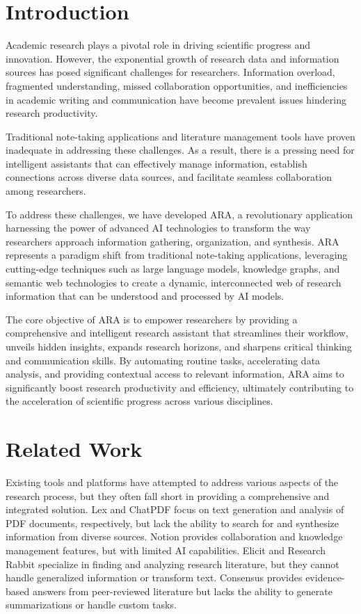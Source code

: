 \documentclass[a4paper,conference]{IEEEtran}
\begin{document}
\section{Introduction}
Academic research plays a pivotal role in driving scientific progress and innovation. However, the exponential growth of research data and information sources has posed significant challenges for researchers. Information overload, fragmented understanding, missed collaboration opportunities, and inefficiencies in academic writing and communication have become prevalent issues hindering research productivity.

Traditional note-taking applications and literature management tools have proven inadequate in addressing these challenges. As a result, there is a pressing need for intelligent assistants that can effectively manage information, establish connections across diverse data sources, and facilitate seamless collaboration among researchers.

To address these challenges, we have developed ARA, a revolutionary application harnessing the power of advanced AI technologies to transform the way researchers approach information gathering, organization, and synthesis. ARA represents a paradigm shift from traditional note-taking applications, leveraging cutting-edge techniques such as large language models, knowledge graphs, and semantic web technologies to create a dynamic, interconnected web of research information that can be understood and processed by AI models.

The core objective of ARA is to empower researchers by providing a comprehensive and intelligent research assistant that streamlines their workflow, unveils hidden insights, expands research horizons, and sharpens critical thinking and communication skills. By automating routine tasks, accelerating data analysis, and providing contextual access to relevant information, ARA aims to significantly boost research productivity and efficiency, ultimately contributing to the acceleration of scientific progress across various disciplines.

\section{Related Work}
Existing tools and platforms have attempted to address various aspects of the research process, but they often fall short in providing a comprehensive and integrated solution. Lex \cite{lex} and ChatPDF \cite{chatpdf} focus on text generation and analysis of PDF documents, respectively, but lack the ability to search for and synthesize information from diverse sources. Notion \cite{notion} provides collaboration and knowledge management features, but with limited AI capabilities. Elicit \cite{elicit} and Research Rabbit \cite{researchrabbit} specialize in finding and analyzing research literature, but they cannot handle generalized information or transform text. Consensus \cite{consensus} provides evidence-based answers from peer-reviewed literature but lacks the ability to generate summarizations or handle custom tasks.
\end{document}
